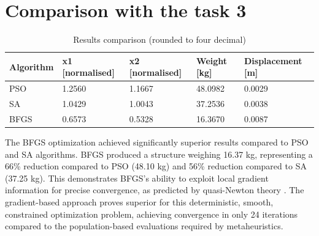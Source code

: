 \section{Comparison with the task 3}

\begin{table}[H]
    \centering
    \begin{tabular}{|l|l|l|l|l|}
    \hline
    Algorithm & x1 [normalised] & x2 [normalised] & Weight [kg] & Displacement [m] \\ \hline
    PSO & 1.2560 & 1.1667 & 48.0982 & 0.0029 \\ \hline
    SA & 1.0429 & 1.0043 & 37.2536 & 0.0038 \\ \hline
    BFGS & 0.6573 & 0.5328 & 16.3670 & 0.0087 \\ \hline
    \end{tabular}
    \caption{Results comparison (rounded to four decimal)}
    \label{tab:comparison_task3}
\end{table}

The BFGS optimization achieved significantly superior results compared to PSO and SA algorithms. BFGS produced a structure weighing 16.37 kg, representing a 66\% reduction compared to PSO (48.10 kg) and 56\% reduction compared to SA (37.25 kg). This demonstrates BFGS's ability to exploit local gradient information for precise convergence, as predicted by quasi-Newton theory \cite{nocedalwright1999}. The gradient-based approach proves superior for this deterministic, smooth, constrained optimization problem, achieving convergence in only 24 iterations compared to the population-based evaluations required by metaheuristics.
